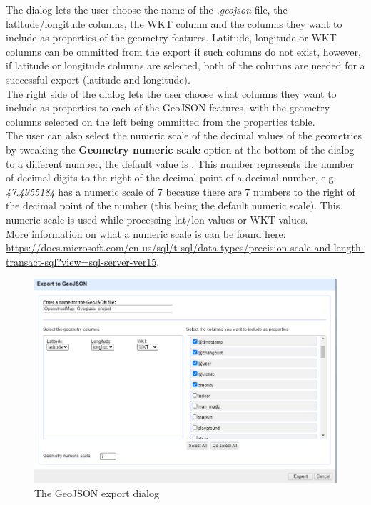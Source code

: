 The dialog lets the user choose the name of the \textit{.geojson} file, the latitude/longitude columns, the WKT column
and the columns they want to include as properties of the geometry features. Latitude, longitude or WKT columns can be
ommitted from the export if such columns do not exist, however, if latitude or longitude columns are selected,
both of the columns are needed for a successful export (latitude and longitude).\\
\newline
The right side of the dialog lets the user choose what columns they want to include as properties to each of the GeoJSON features,
with the geometry columns selected on the left being ommitted from the properties table.\\
\newline
The user can also select the numeric scale of the decimal values of the geometries by tweaking the \textbf{Geometry numeric scale}
option at the bottom of the dialog to a different number, the default value is . This number represents the
number of decimal digits to the right  of the decimal point of a decimal number, e.g. \textit{47.4955184} has a numeric scale of
7 because there are 7 numbers to the right of the decimal point of the number (this being the default numeric scale).
This numeric scale is used while processing lat/lon values or WKT values. \\
\newline
More information on what a numeric scale is can be found here:
\href{https://docs.microsoft.com/en-us/sql/t-sql/data-types/precision-scale-and-length-transact-sql?view=sql-server-ver15}{https://docs.microsoft.com/en-us/sql/t-sql/data-types/precision-scale-and-length-transact-sql?view=sql-server-ver15}.

\begin{figure}[H]
    \includegraphics[width=\linewidth]{./Figures/GeoJSON_Export/geojson_export_dialog.png}
    \caption{The GeoJSON export dialog}
\end{figure}


